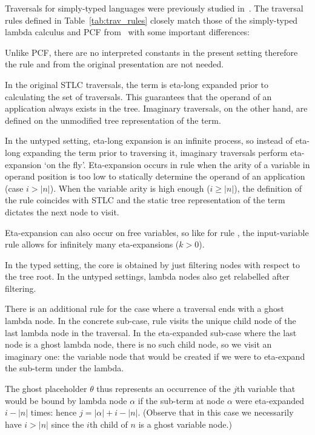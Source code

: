 \documentclass{elsarticle}
\theoremstyle{plain}
\theoremstyle{definition}
\theoremstyle{remark}
\newcommand{\ghostlmd}{{\lambda\!\!\lambda}}
\newcommand{\ghostvar}{\theta}
\begin{document}
Traversals for simply-typed languages were previously studied in~\cite{BlumPhd}.
The traversal rules defined in Table~\ref{tab:trav_rules} closely match those of the simply-typed lambda calculus and PCF from~\cite{BlumPhd} with some important differences:
\begin{description}[nosep]
  \item[No interpreted constants] Unlike PCF, there are no interpreted constants in the present setting therefore the rule  and  from the original presentation are not needed.

  \item[No $\eta$-long expansion] In the original STLC traversals, the term is eta-long expanded prior to calculating the set of traversals. This guarantees that the operand of an application always exists in the tree.
  Imaginary traversals, on the other hand, are defined on the unmodified tree representation of the term.

  \item[On-the-fly $\eta$-expansion] In the untyped setting, eta-long expansion is an infinite process, so instead of eta-long expanding the term prior to traversing it, imaginary traversals perform eta-expansion  `on the fly'. Eta-expansion occurs in rule  when the arity of a variable in operand position is too low to statically determine the operand of an application (case $i>|n|$). When the variable arity is high enough ($i\geq|n|$), the definition of the rule coincides with STLC and the static tree representation of the term dictates the next node to visit.

  \item[Free variables] Eta-expansion can also occur on free variables, so like for  rule , the input-variable rule allows for infinitely many eta-expansions ($k>0$).

  \item[Traversal core] In the typed setting, the core is  obtained by just filtering nodes with respect to the tree root. In the untyped settings, lambda nodes also get relabelled after filtering.

  \item[Traversing ghost nodes] There is an additional rule \rulenamet{Lam^\ghostlmd} for the case where a traversal ends with a ghost lambda node. In the concrete sub-case, rule  visits the unique child node of the last lambda node in the traversal. In the eta-expanded sub-case where the last node is a ghost lambda node, there is no such child node, so we visit an imaginary one: the variable node that would be created if we were to eta-expand the sub-term under the lambda.

   The ghost placeholder $\ghostvar$ thus represents an occurrence of the $j$th variable that would be bound by lambda node $\alpha$ if the sub-term at node $\alpha$ were eta-expanded $i-|n|$ times: hence $j = |\alpha| + i - |n|$.
   (Observe that in this case we necessarily have $i>|n|$ since the $i$th child of $n$ is a ghost variable node.)
\end{description}
\end{document}
